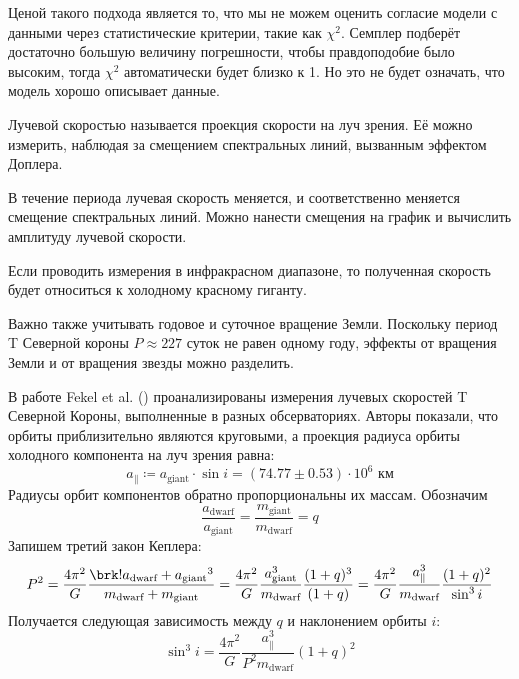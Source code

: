 Ценой такого подхода является то, что мы не можем оценить согласие модели с данными через статистические критерии, такие как $\chi^2$. Семплер подберёт достаточно большую величину погрешности, чтобы правдоподобие было высоким, тогда $\chi^2$ автоматически будет близко к 1. Но это не будет означать, что модель хорошо описывает данные.



Лучевой скоростью называется проекция скорости на луч зрения. Её можно измерить, наблюдая за смещением спектральных линий, вызванным эффектом Доплера.

В течение периода лучевая скорость меняется, и соответственно меняется смещение спектральных линий. Можно нанести смещения на график и вычислить амплитуду лучевой скорости.


Если проводить измерения в инфракрасном диапазоне, то полученная скорость будет относиться к холодному красному гиганту.

Важно также учитывать годовое и суточное вращение Земли. Поскольку период T Северной короны $P \approx 227$ суток не равен одному году, эффекты от вращения Земли и от вращения звезды можно разделить.



В работе Fekel et al. (\citeyear{RadialVelocities}) проанализированы измерения лучевых скоростей T Северной Короны, выполненные в разных обсерваториях. Авторы показали, что орбиты приблизительно являются круговыми, а проекция радиуса орбиты холодного компонента на луч зрения равна:
\[
a_\| \coloneq a_\text{giant} \cdot \sin i = (74.77 \pm 0.53) \cdot 10^6 \text{ км}
\]
%
%
Радиусы орбит компонентов обратно пропорциональны их массам. Обозначим
\[
\frac{a_\text{dwarf}}{a_\text{giant}} = \frac{m_\text{giant}}{m_\text{dwarf}} = q
\]
Запишем третий закон Кеплера:
\[
P^2 = \frac{4\pi^2}{G} \frac{\brk!{a_\text{dwarf} + a_\text{giant}}^3}{m_\text{dwarf} + m_\text{giant}}
= \frac{4\pi^2}{G} \frac{a_\text{giant}^3}{m_\text{dwarf}} \frac{(1 + q)^3}{(1 + q)}
= \frac{4\pi^2}{G} \frac{a_\|^3}{m_\text{dwarf}} \frac{(1 + q)^2}{\sin^3 i}
\]
Получается следующая зависимость между $q$ и наклонением орбиты $i$:
\[
\sin^3 i = \frac{4\pi^2}{G} \frac{a_\|^3}{P^2 m_\text{dwarf}} (1 + q)^2
\]

